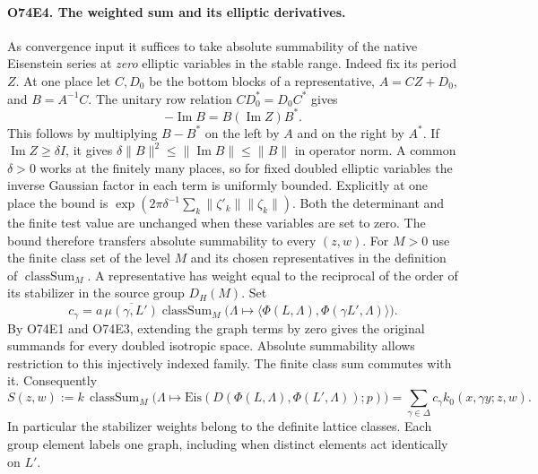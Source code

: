 \paragraph{O74E4. The weighted sum and its elliptic derivatives.}
As convergence input it suffices to take absolute summability of the
native Eisenstein series at \emph{zero} elliptic variables in the
stable range. Indeed fix its period $Z$. At one place let $C,D_0$
be the bottom blocks of a representative, $A=CZ+D_0$, and
$B=A^{-1}C$. The unitary row relation $CD_0^*=D_0C^*$ gives
\[
 -\operatorname{Im}B=B(\operatorname{Im}Z)B^*.
\]
This follows by multiplying $B-B^*$ on the left by $A$ and on the
right by $A^*$. If $\operatorname{Im} Z\ge\delta I$, it gives
$\delta\|B\|^2\le\|\operatorname{Im}B\|\le\|B\|$ in operator norm.
A common $\delta>0$ works at the finitely many places, so for fixed
doubled elliptic variables the inverse Gaussian factor in each term
is uniformly bounded. Explicitly at one place the bound is
$\exp(2\pi\delta^{-1}\sum_k\|\zeta'_k\|\|\zeta_k\|)$.
Both the determinant and the finite test value are unchanged when
these variables are set to zero. The bound therefore transfers
absolute summability to every $(z,w)$. For $M>0$ use the finite class set of
the level $M$ and its chosen representatives in the definition of
$\operatorname{classSum}_M$. A representative has weight equal to the
reciprocal of the order of its stabilizer in the source group $D_H(M)$.
Set
\[
 c_\gamma=a\,\overline{\mu(\gamma,L')}
 \operatorname{classSum}_M\bigl(\Lambda\mapsto
  \langle\Phi(L,\Lambda),\Phi(\gamma L',\Lambda)\rangle\bigr).
\]
By O74E1 and O74E3, extending the graph terms by zero gives the
original summands for every doubled isotropic space. Absolute
summability allows restriction to this injectively indexed family.
The finite class sum commutes with it. Consequently
\[
 S(z,w):= k\,\operatorname{classSum}_M\bigl(\Lambda\mapsto
   \mathrm{Eis}(D(\Phi(L,\Lambda),\Phi(L',\Lambda));p)\bigr)
    =\sum_{\gamma\in\Delta} c_\gamma k_0(x,\gamma y;z,w).
\]
In particular the stabilizer weights belong to the definite lattice
classes. Each group element labels one graph, including when distinct
elements act identically on $L'$.

